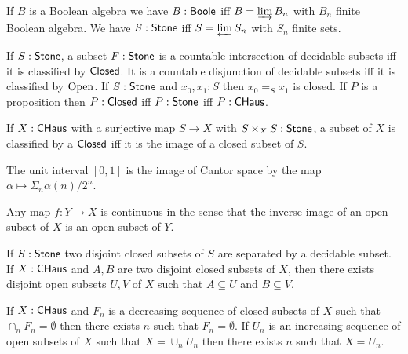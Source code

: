 \begin{theorem}
  If $B$ is a Boolean algebra we have $B:\mathsf{Boole}$ iff $B = \varinjlim B_n$ with $B_n$ finite Boolean algebra.
  We have $S:\mathsf{Stone}$ iff $S = \varprojlim S_n$ with $S_n$ finite sets.
\end{theorem}

\begin{theorem}
  If $S:\mathsf{Stone}$, a subset $F:\mathsf{Stone}$ is a countable intersection of decidable subsets iff it is classified by $\mathsf{Closed}$.
  It is a countable disjunction of decidable subsets iff it is classified by $\mathrm{Open}$.
  If $S:\mathsf{Stone}$ and $x_0,x_1:S$ then $x_0 =_S x_1$ is closed. If $P$ is a proposition then $P:\mathsf{Closed}$ iff $P:\mathsf{Stone}$ iff
  $P:\mathsf{CHaus}$.
\end{theorem}

\begin{theorem}
  If $X:\mathsf{CHaus}$ with a surjective map $S\rightarrow X$ with $S\times_X S:\mathsf{Stone}$, a subset of $X$ is classified
  by a $\mathsf{Closed}$ iff it is the image of a closed subset of $S$.
\end{theorem}

\begin{definition}
  The unit interval $[0,1]$ is the image of Cantor space by the map $\alpha\mapsto \Sigma_n \alpha(n)/2^n$.
\end{definition}


Any map $f:Y\rightarrow X$ is continuous in the sense that the inverse image of an open subset of $X$ is an open
subset of $Y$.

\begin{theorem}
  If $S:\mathsf{Stone}$ two disjoint closed subsets of $S$ are separated by a decidable subset. If $X:\mathsf{CHaus}$ and $A,B$ are
  two disjoint closed subsets of $X$, then there exists disjoint open subsets $U,V$ of $X$ such that $A\subseteq U$
  and $B\subseteq V$.
\end{theorem}

\begin{theorem}
  If $X:\mathsf{CHaus}$ and $F_n$ is a decreasing sequence of closed subsets of $X$ such that $\cap_n F_n = \emptyset$
  then there exists $n$ such that $F_n = \emptyset$. If $U_n$ is an increasing sequence of open subsets of $X$
  such that $X = \cup_n U_n$ then there exists $n$ such that $X = U_n$.  
\end{theorem}
